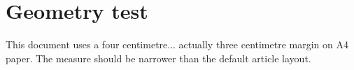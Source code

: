 \documentclass{article}
\begin{document}
\section{Geometry test}
This document uses a four centimetre... actually three centimetre margin on A4 paper.
The measure should be narrower than the default article layout.
\end{document}
